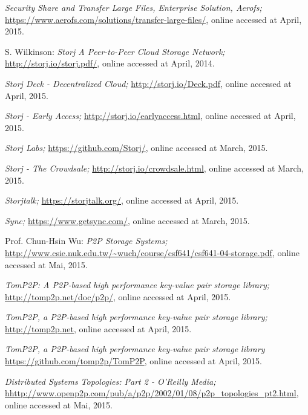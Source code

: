 \begin{thebibliography}{99}
		\emph{Security Share and Transfer Large Files, Enterprise Solution, Aerofs;}
		\url{https://www.aerofs.com/solutions/transfer-large-files/},
		online accessed at April, 2015.
		
		S. Wilkinson:
		\emph{Storj A Peer-to-Peer Cloud Storage Network;}
		\url{http://storj.io/storj.pdf/},
		online accessed at April, 2014.
		
		\emph{Storj Deck - Decentralized Cloud;}
		\url{http://storj.io/Deck.pdf},
		online accessed at April, 2015.

		\emph{Storj - Early Access;}
		\url{http://storj.io/earlyaccess.html},
		online accessed at April, 2015.
		
		\emph{Storj Labs;}
		\url{https://github.com/Storj/},
		online accessed at March, 2015.
		
		\emph{Storj - The Crowdsale;}
		\url{http://storj.io/crowdsale.html},
		online accessed at March, 2015.
		
		\emph{Storjtalk;}
		\url{https://storjtalk.org/},
		online accessed at April, 2015.
		
		\emph{Sync;}
		\url{https://www.getsync.com/},
		online accessed at March, 2015.

		Prof. Chun-Hsin Wu:
		\emph{P2P Storage Systems;}
		\url{http://www.csie.nuk.edu.tw/~wuch/course/csf641/csf641-04-storage.pdf},
		online accessed at Mai, 2015.
		
		\emph{TomP2P: A P2P-based high performance key-value pair storage library;}
		\url{http://tomp2p.net/doc/p2p/},
		online accessed at April, 2015.		

		\emph{TomP2P, a P2P-based high performance key-value pair storage library;}
		\url{http://tomp2p.net},
		online accessed at April, 2015.

		\emph{TomP2P, a P2P-based high performance key-value pair storage library}
		\url{https://github.com/tomp2p/TomP2P},
		online accessed at April, 2015.

		\emph{Distributed Systems Topologies: Part 2 - O'Reilly Media;}
		\url{hhttp://www.openp2p.com/pub/a/p2p/2002/01/08/p2p_topologies_pt2.html},
		online accessed at Mai, 2015.


\end{thebibliography}
